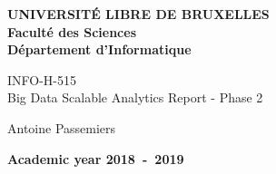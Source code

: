 \documentclass[11pt,a4paper,oneside]{thesis}
\begin{document}
\begin{titlepage}
\begin{center}
\textbf{UNIVERSIT\'E LIBRE DE BRUXELLES}\\
\textbf{Facult\'{e} des Sciences}\\
\textbf{D\'{e}partement d'Informatique}
\vfill{}\vfill{}

{\LARGE  INFO-H-515 \\
 \vspace{0.2cm}
 Big Data Scalable Analytics
 \vspace*{2cm}
 \linebreak[4] Report - Phase 2
}

\vspace{0.5cm}

{\Huge \par}
\begin{center}{Antoine Passemiers}\end{center}{\Huge \par}
\vfill{}\vfill{}
{\large }\hfill{}{}
{\large\par}\vfill{}\vfill{}\enlargethispage{3cm}
\textbf{Academic year 2018~-~2019}
\end{center}
\end{titlepage}



\makeatletter
\def\BState{\State\hskip-\ALG@thistlm}
\makeatother

\thispagestyle{empty} 
\setcounter{page}{1}
\tableofcontents
\mainmatter 








\backmatter

\printindex %

%

\printbibliography
\end{document}
